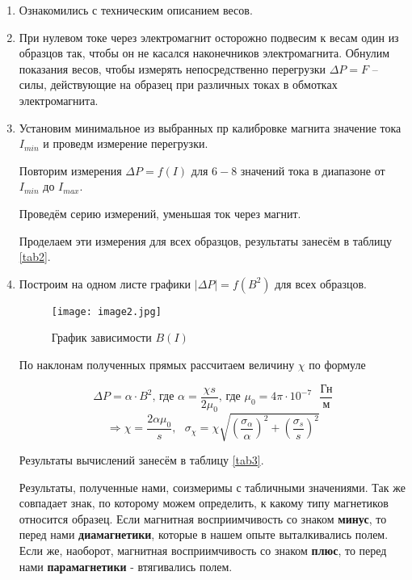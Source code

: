 \documentclass[a4paper,12pt]{article} %
\begin{document}
\begin{enumerate}
    \item Ознакомились с техническим описанием весов.
    
    \item При нулевом токе через электромагнит осторожно подвесим к весам один из образцов так, чтобы он не касался наконечников электромагнита. 
    Обнулим показания весов, чтобы измерять непосредственно перегрузки $\Delta P = F$ -- силы, действующие на образец при различных токах в обмотках электромагнита.
    
    \item Установим минимальное из выбранных пр калибровке магнита значение тока $I_{min}$ и проведм измерение перегрузки.
    
    Повторим измерения $\Delta P = f(I)$ для $6-8$ значений тока в диапазоне от $I_{min}$ до $I_{max}$.
    
    Проведём серию измерений, уменьшая ток через магнит. 

    Проделаем эти измерения для всех образцов, результаты занесём в таблицу \ref{tab2}.

    \item Построим на одном листе графики $|\Delta P| = f(B^2)$ для всех образцов.

    \begin{figure}[h]
        \begin{center}
    		\texttt{[image: image2.jpg]}
        \end{center}
        \caption{График зависимости $B(I)$}
        \label{plot1}
    \end{figure}

    По наклонам полученных прямых рассчитаем величину $\chi$ по формуле

    \[ \Delta P = \alpha \cdot B^2 \text{, где } \alpha = \frac{\chi s}{2\mu_0} \text{, где } \mu_0 = 4\pi \cdot 10^{-7} \text{ } \frac{\text{Гн}}{\text{м}} \]
    \[ \Longrightarrow \chi = \frac{2\alpha\mu_0}{s}, \text{ } \sigma_{\chi} = \chi\sqrt{\left(\frac{\sigma_{\alpha}}{\alpha}\right)^2 + \left(\frac{\sigma_{s}}{s}\right)^2} \]

    Результаты вычислений занесём в таблицу \ref{tab3}.

    Результаты, полученные нами, соизмеримы с табличными значениями. Так же совпадает знак, по которому можем определить, к какому типу магнетиков относится образец. Если магнитная восприимчивость со знаком \textbf{минус}, то перед нами \textbf{диамагнетики}, которые в нашем опыте выталкивались полем. Если же, наоборот, магнитная восприимчивость со знаком \textbf{плюс}, то перед нами \textbf{парамагнетики} - втягивались полем.


\end{enumerate}
\end{document}

